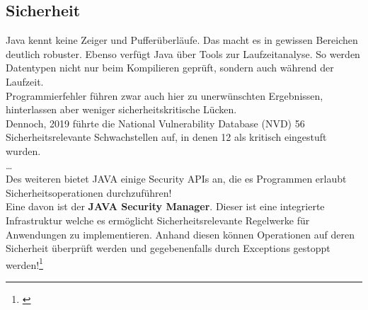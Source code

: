 \documentclass[a4paper,12pt]{scrartcl}
\begin{document}
\subsection{Sicherheit}
Java kennt keine Zeiger und Pufferüberläufe. Das macht es in gewissen Bereichen deutlich robuster.  Ebenso verfügt Java über Tools zur Laufzeitanalyse. So werden
Datentypen nicht nur beim Kompilieren geprüft, sondern auch während der Laufzeit.\\
Programmierfehler führen zwar auch hier zu unerwünschten Ergebnissen, hinterlassen aber weniger sicherheitskritische Lücken.\\Dennoch, 2019 führte die National Vulnerability Database (NVD) 56 Sicherheitsrelevante Schwachstellen auf, in denen 12 als kritisch eingestuft wurden.\\
\dots\\
Des weiteren bietet JAVA einige Security APIs an, die es Programmen erlaubt Sicherheitsoperationen durchzuführen!\\
Eine davon ist der \textbf{JAVA Security Manager}. Dieser ist eine integrierte Infrastruktur welche es ermöglicht Sicherheitsrelevante Regelwerke für Anwendungen zu implementieren. Anhand diesen können Operationen auf deren Sicherheit überprüft werden und gegebenenfalls durch Exceptions gestoppt werden!\footnote{\cite{1265452}}
\newpage
\end{document}
